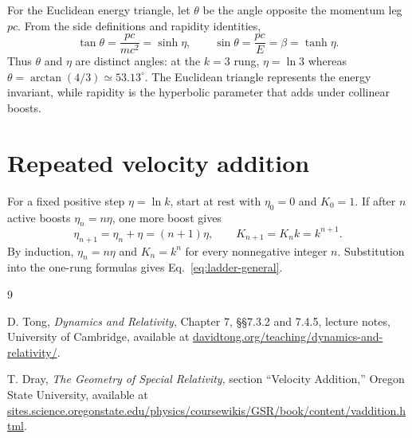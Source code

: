 \documentclass[12pt]{article}
\begin{document}
For the Euclidean energy triangle, let $\theta$ be the angle opposite the momentum leg $pc$. From the side definitions and rapidity identities,
\begin{equation}
  \tan\theta=\frac{pc}{mc^2}=\sinh\eta,
  \qquad
  \sin\theta=\frac{pc}{E}=\beta=\tanh\eta.
  \label{eq:triangle-angle-rapidity}
\end{equation}
Thus $\theta$ and $\eta$ are distinct angles: at the $k=3$ rung, $\eta=\ln3$ whereas $\theta=\arctan(4/3)\simeq53.13^\circ$. The Euclidean triangle represents the energy invariant, while rapidity is the hyperbolic parameter that adds under collinear boosts.

\section{Repeated velocity addition}
\label{app:boost-composition}

For a fixed positive step $\eta=\ln k$, start at rest with $\eta_0=0$ and $K_0=1$. If after $n$ active boosts $\eta_n=n\eta$, one more boost gives
\begin{equation}
  \eta_{n+1}=\eta_n+\eta=(n+1)\eta,
  \qquad
  K_{n+1}=K_n k=k^{n+1}.
  \label{eq:appendix-induction}
\end{equation}
By induction, $\eta_n=n\eta$ and $K_n=k^n$ for every nonnegative integer $n$. Substitution into the one-rung formulas gives Eq.~\eqref{eq:ladder-general}.

\begin{thebibliography}{9}
\small
{}
\raggedright
{}

D. Tong,
\emph{Dynamics and Relativity},
Chapter 7, §§7.3.2 and 7.4.5, lecture notes, University of Cambridge,
available at \href{https://davidtong.org/teaching/dynamics-and-relativity/}{davidtong.org/teaching/dynamics-and-relativity/}.

T. Dray,
\emph{The Geometry of Special Relativity},
section ``Velocity Addition,'' Oregon State University,
available at \href{https://sites.science.oregonstate.edu/physics/coursewikis/GSR/book/content/vaddition.html}{sites.science.oregonstate.edu/physics/coursewikis/GSR/book/content/vaddition.html}.

\end{thebibliography}
\end{document}
